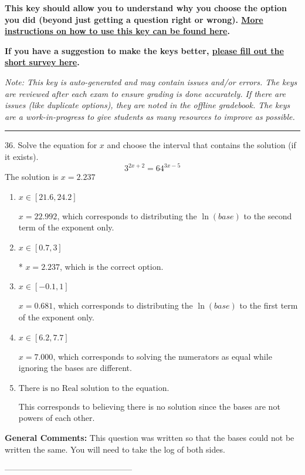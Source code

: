 \documentclass{article}[14pt]
\begin{document}
\textbf{This key should allow you to understand why you choose the option you did (beyond just getting a question right or wrong). \href{https://xronos.clas.ufl.edu/mac1105spring2020/courseDescriptionAndMisc/Exams/LearningFromResults}{More instructions on how to use this key can be found here}.}

\textbf{If you have a suggestion to make the keys better, \href{https://forms.gle/CZkbZmPbC9XALEE88}{please fill out the short survey here}.}

\textit{Note: This key is auto-generated and may contain issues and/or errors. The keys are reviewed after each exam to ensure grading is done accurately. If there are issues (like duplicate options), they are noted in the offline gradebook. The keys are a work-in-progress to give students as many resources to improve as possible.}

\rule{\textwidth}{0.4pt}

36. Solve the equation for $x$ and choose the interval that contains the solution (if it exists).
$$ 3^{2x+2} = 64^{3x-5} $$ 
The solution is $ x = 2.237 $ 

\begin{enumerate}[label=\Alph*.] 
\item $ x \in [21.6, 24.2] $ 

 $x = 22.992$, which corresponds to distributing the $\ln(base)$ to the second term of the exponent only. 
\item $ x \in [0.7, 3] $ 

 * $x = 2.237$, which is the correct option. 
\item $ x \in [-0.1, 1] $ 

 $x = 0.681$, which corresponds to distributing the $\ln(base)$ to the first term of the exponent only. 
\item $ x \in [6.2, 7.7] $ 

 $x = 7.000$, which corresponds to solving the numerators as equal while ignoring the bases are different. 
\item $ \text{There is no Real solution to the equation.} $ 

 This corresponds to believing there is no solution since the bases are not powers of each other. 
\end{enumerate} 
 
\textbf{General Comments:} This question was written so that the bases could not be written the same. You will need to take the log of both sides.

-----------------------------------------------
\end{document}
